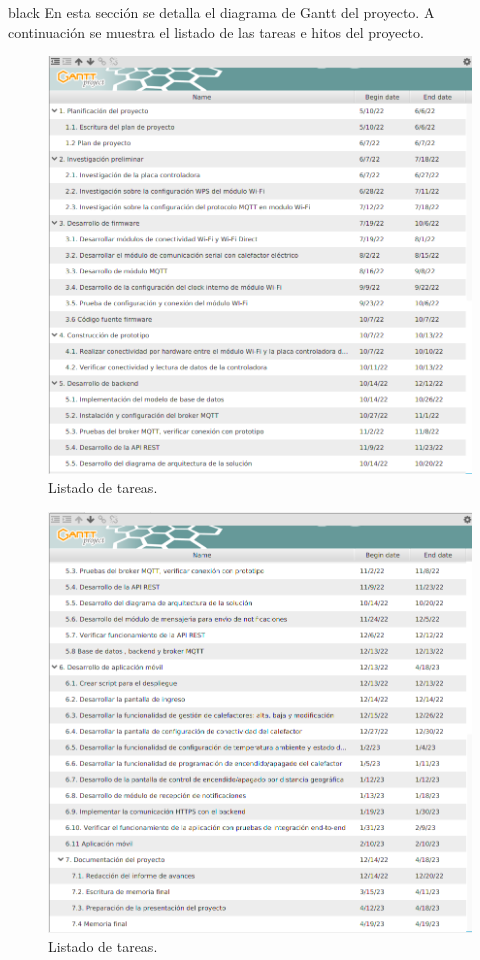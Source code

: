 \documentclass[
11pt, %
codirector, %
]{charter}
\begin{document}
\begin{consigna}{black}
En esta sección se detalla el diagrama de Gantt del proyecto. 
A continuación se muestra el listado de las tareas e hitos del proyecto.

\begin{figure}[htpb]

\includegraphics[width=1.0\textwidth]{./Figuras/planificacion-1.png}
\caption{Listado de tareas.}
\label{fig:AoN}
\end{figure}
\begin{figure}[htpb]

\includegraphics[width=1.0\textwidth]{./Figuras/planificacion-2.png}
\caption{Listado de tareas.}
\label{fig:AoN}
\end{figure}


\end{consigna}
\end{document}
